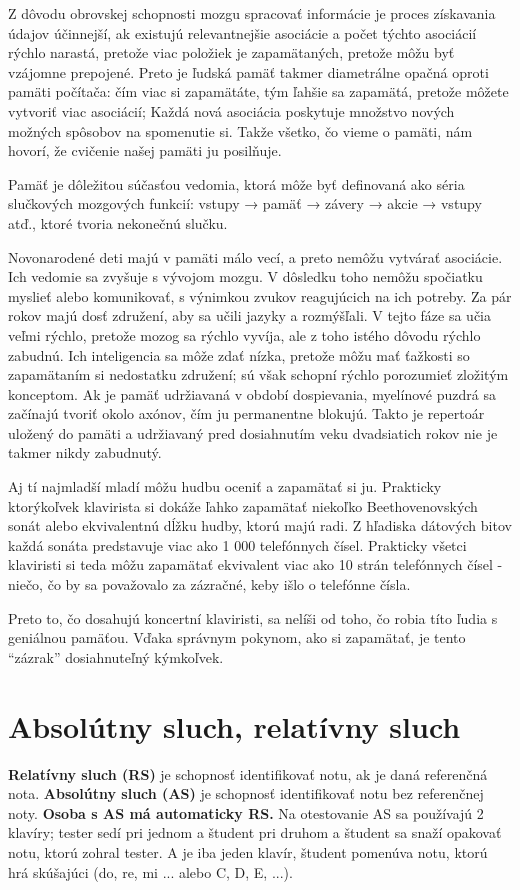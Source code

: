 \documentclass[11pt,a4paper]{book}
\begin{document}
Z dôvodu obrovskej schopnosti mozgu spracovať informácie je proces získavania údajov účinnejší, ak existujú relevantnejšie asociácie a počet týchto asociácií rýchlo narastá, pretože viac položiek je zapamätaných, pretože môžu byť vzájomne prepojené. Preto je ľudská pamäť takmer diametrálne opačná oproti pamäti počítača: čím viac si zapamätáte, tým ľahšie sa zapamätá, pretože môžete vytvoriť viac asociácií; Každá nová asociácia poskytuje množstvo nových možných spôsobov na spomenutie si. Takže všetko, čo vieme o pamäti, nám hovorí, že cvičenie našej pamäti ju posilňuje.

Pamäť je dôležitou súčasťou vedomia, ktorá môže byť definovaná ako séria slučkových mozgových funkcií: vstupy → pamäť → závery → akcie → vstupy atď., ktoré tvoria nekonečnú slučku.

Novonarodené deti majú v pamäti málo vecí, a preto nemôžu vytvárať asociácie. Ich vedomie sa zvyšuje s vývojom mozgu. V dôsledku toho nemôžu spočiatku myslieť alebo komunikovať, s výnimkou zvukov reagujúcich na ich potreby. Za pár rokov majú dosť združení, aby sa učili jazyky a rozmýšľali. V tejto fáze sa učia veľmi rýchlo, pretože mozog sa rýchlo vyvíja, ale z toho istého dôvodu rýchlo zabudnú. Ich inteligencia sa môže zdať nízka, pretože môžu mať ťažkosti so zapamätaním si nedostatku združení; sú však schopní rýchlo porozumieť zložitým konceptom. Ak je pamäť udržiavaná v období dospievania, myelínové puzdrá sa začínajú tvoriť okolo axónov, čím ju permanentne blokujú. Takto je repertoár uložený do pamäti a udržiavaný pred dosiahnutím veku dvadsiatich rokov nie je takmer nikdy zabudnutý.

Aj tí najmladší mladí môžu hudbu oceniť a zapamätať si ju. Prakticky ktorýkoľvek klavirista si dokáže ľahko zapamätať niekoľko Beethovenovských sonát alebo ekvivalentnú dĺžku hudby, ktorú majú radi. Z hľadiska dátových bitov každá sonáta predstavuje viac ako 1 000 telefónnych čísel. Prakticky všetci klaviristi si teda môžu zapamätať ekvivalent viac ako 10 strán telefónnych čísel - niečo, čo by sa považovalo za zázračné, keby išlo o telefónne čísla.

Preto to, čo dosahujú koncertní klaviristi, sa nelíši od toho, čo robia títo ľudia s geniálnou pamäťou. Vďaka správnym pokynom, ako si zapamätať, je tento “zázrak” dosiahnuteľný kýmkoľvek.

\section{Absolútny sluch, relatívny sluch}\label{s:absolute-pitch}
\textbf{Relatívny sluch (RS)} je schopnosť identifikovať notu, ak je daná referenčná nota. \textbf{Absolútny sluch (AS)} je schopnosť identifikovať notu bez referenčnej noty. \textbf{Osoba s AS má automaticky RS.} Na otestovanie AS sa používajú 2 klavíry; tester sedí pri jednom a študent pri druhom a študent sa snaží opakovať notu, ktorú zohral tester. A je iba jeden klavír, študent pomenúva notu, ktorú hrá skúšajúci (do, re, mi ... alebo C, D, E, ...).
\end{document}
